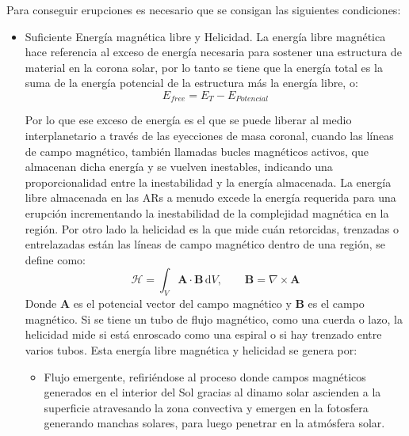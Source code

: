 Para conseguir erupciones es necesario que se consigan las siguientes condiciones:
\begin{itemize}
    \item Suficiente Energía magnética libre y Helicidad. La energía libre magnética hace referencia al exceso de energía necesaria para sostener una estructura de material en la corona solar, por lo tanto se tiene que la energía total es la suma de la energía potencial de la estructura más la energía libre, o:
\begin{equation}
    E_{free}=E_{T}-E_{Potencial}
\end{equation}

Por lo que ese exceso de energía es el que se puede liberar al medio interplanetario a través de las eyecciones de masa coronal, cuando las líneas de campo magnético, también llamadas bucles magnéticos activos, que almacenan dicha energía y se vuelven inestables, indicando una proporcionalidad entre la inestabilidad y la energía almacenada. La energía libre almacenada en las \acp{AR} a menudo excede la energía requerida para una erupción incrementando la inestabilidad de la complejidad magnética en la región. 
Por otro lado la helicidad es la que mide cuán retorcidas, trenzadas o entrelazadas están las líneas de campo magnético dentro de una región, se define como:
\begin{equation}
    \mathcal{H} = \int_V \mathbf{A}\cdot \mathbf{B}\,\mathrm{d}V,
\qquad
\mathbf{B} = \nabla \times \mathbf{A}
\end{equation}
Donde $\mathbf{A}$ es el potencial vector del campo magnético y $\mathbf{B}$ es el campo magnético. Si se tiene un tubo de flujo magnético, como una cuerda o lazo, la helicidad mide si está enroscado como una espiral o si hay trenzado entre varios tubos.
Esta energía libre magnética y helicidad se genera por: 
    \begin{itemize}
    \item Flujo emergente, refiriéndose al proceso donde campos magnéticos generados en el interior del Sol gracias al dinamo solar ascienden a la superficie atravesando la zona convectiva y emergen en la fotosfera generando manchas solares, para luego penetrar en la atmósfera solar.
    

\end{itemize}
\end{itemize}
